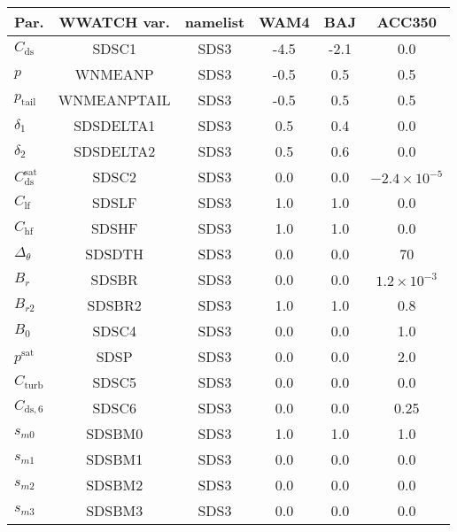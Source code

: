 \begin{table} \begin{center}
\begin{tabular}{|l|c|c|c|c|c|} \hline \hline
Par.         &  WWATCH var. & namelist & WAM4 & BAJ  & ACC350 \\
\hline
  $C_{\mathrm{ds}}$                 &  SDSC1          & SDS3 & -4.5 & -2.1&  0.0 \\
  $p$                               &  WNMEANP        & SDS3 & -0.5 & 0.5 &  0.5    \\
  $p_{\mathrm{tail}}$               &  WNMEANPTAIL    & SDS3 & -0.5 & 0.5 &  0.5 \\
  $\delta_1$                        &  SDSDELTA1      & SDS3 & 0.5  & 0.4 &  0.0 \\
  $\delta_2$                        &  SDSDELTA2      & SDS3 & 0.5  & 0.6 &  0.0 \\
  $C_{\mathrm{ds}}^{\mathrm{sat}}$  & SDSC2           & SDS3 & 0.0  & 0.0 & $-2.4\times 10^{-5}$\\
  $C_{\mathrm{lf}}$                 &  SDSLF          & SDS3 & 1.0  & 1.0 &  0.0 \\
  $C_{\mathrm{hf}}$                 &  SDSHF          & SDS3 & 1.0  & 1.0 &  0.0 \\
  $\Delta_\theta$                   &  SDSDTH         & SDS3 & 0.0  & 0.0 & 70  \\
  $B_r$                             &  SDSBR          & SDS3 & 0.0  & 0.0 & $1.2\times 10^{-3}$  \\
  $B_{r2}$                          &  SDSBR2         & SDS3 & 1.0  & 1.0 & 0.8  \\
  $B_0$                             &  SDSC4          & SDS3 & 0.0  & 0.0 & 1.0   \\
  $p^{\mathrm{sat}}$                &  SDSP           & SDS3 & 0.0  & 0.0 &  2.0   \\
  $C_{\mathrm{turb}}$               & SDSC5           & SDS3  & 0.0 & 0.0 &  0.0   \\
  $C_{\mathrm{ds},6}$               & SDSC6           & SDS3  & 0.0 & 0.0 &  0.25 \\
  $s_{m0}$                          & SDSBM0          & SDS3  & 1.0 & 1.0 &  1.0  \\
  $s_{m1}$                          & SDSBM1          & SDS3  & 0.0 & 0.0 &  0.0  \\
  $s_{m2}$                          & SDSBM2          & SDS3  & 0.0 & 0.0 &  0.0  \\
  $s_{m3}$                          & SDSBM3          & SDS3  & 0.0 & 0.0 &  0.0  \\

\end{tabular}
\end{center}
\end{table}
